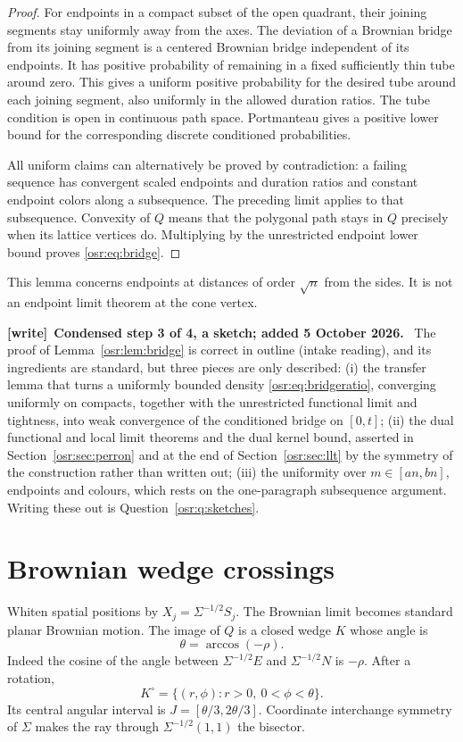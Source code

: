 \documentclass[11pt,letterpaper]{article}
\numberwithin{equation}{section}
\newenvironment{writenote}[1][]{\par\smallskip\begingroup\small
 \noindent\textbf{[write]}\if\relax\detokenize{#1}\relax\else~\textbf{#1.}\fi\ }%
 {\par\endgroup\smallskip}
\begin{document}
\begin{proof}
For endpoints in a compact subset of the open quadrant, their joining segments stay uniformly away from the axes. The deviation of a Brownian bridge from its joining segment is a centered Brownian bridge independent of its endpoints. It has positive probability of remaining in a fixed sufficiently thin tube around zero. This gives a uniform positive probability for the desired tube around each joining segment, also uniformly in the allowed duration ratios. The tube condition is open in continuous path space. Portmanteau gives a positive lower bound for the corresponding discrete conditioned probabilities.

All uniform claims can alternatively be proved by contradiction: a failing sequence has convergent scaled endpoints and duration ratios and constant endpoint colors along a subsequence. The preceding limit applies to that subsequence. Convexity of $Q$ means that the polygonal path stays in $Q$ precisely when its lattice vertices do. Multiplying by the unrestricted endpoint lower bound proves \eqref{osr:eq:bridge}.
\end{proof}
This lemma concerns endpoints at distances of order $\sqrt n$ from the sides. It is not an endpoint limit theorem at the cone vertex.

\begin{writenote}[Condensed step 3 of 4, a sketch; added 5 October 2026]
The proof of Lemma~\ref{osr:lem:bridge} is correct in outline (intake
reading), and its ingredients are standard, but three pieces are only
described: (i) the transfer lemma that turns a uniformly bounded density
\eqref{osr:eq:bridgeratio}, converging uniformly on compacts, together with
the unrestricted functional limit and tightness, into weak convergence of the
conditioned bridge on $[0,t]$; (ii) the dual functional and local limit
theorems and the dual kernel bound, asserted in Section~\ref{osr:sec:perron}
and at the end of Section~\ref{osr:sec:llt} by the symmetry of the
construction rather than written out; (iii) the uniformity over
$m\in[an,bn]$, endpoints and colours, which rests on the one-paragraph
subsequence argument. Writing these out is
Question~\ref{osr:q:sketches}.
\end{writenote}

\section{Brownian wedge crossings}\label{osr:sec:brownian}
Whiten spatial positions by $X_j=\Sigma^{-1/2}S_j$. The Brownian limit becomes standard planar Brownian motion. The image of $Q$ is a closed wedge $K$ whose angle is
\[
 \theta=\arccos(-\rho).
\]
Indeed the cosine of the angle between $\Sigma^{-1/2}E$ and $\Sigma^{-1/2}N$ is $-\rho$. After a rotation,
\[
 K^\circ=\{(r,\phi):r>0,\ 0<\phi<\theta\}.
\]
Its central angular interval is $J=[\theta/3,2\theta/3]$. Coordinate interchange symmetry of $\Sigma$ makes the ray through $\Sigma^{-1/2}(1,1)$ the bisector.
\end{document}

